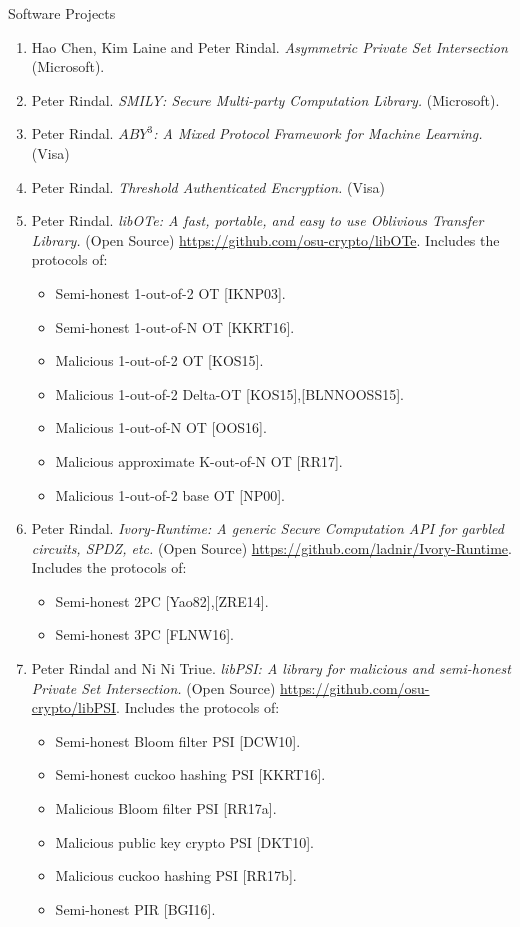 \documentclass{resume} %
\begin{document}
\begin{rSection}{Software Projects}
	
	
	\begin{enumerate}[label=S\arabic* --]
		
		\item Hao Chen, Kim Laine and Peter Rindal. \emph{Asymmetric Private Set Intersection} (Microsoft).
		
		\item Peter Rindal. \emph{SMILY: Secure Multi-party Computation Library.} (Microsoft).
		
		\item  Peter Rindal. \emph{$ABY^3$: A Mixed Protocol Framework for Machine Learning.}  (Visa)
		
		
		\item Peter Rindal. \emph{Threshold Authenticated Encryption.} (Visa)
		
		\item Peter Rindal. \emph{libOTe: A fast, portable, and easy to use Oblivious Transfer Library.}  (Open Source) \url{https://github.com/osu-crypto/libOTe}. Includes the protocols of:
		\begin{itemize}
			\item Semi-honest 1-out-of-2 OT [IKNP03]. 
			\item Semi-honest 1-out-of-N OT [KKRT16].
			\item Malicious 1-out-of-2 OT [KOS15].
			\item Malicious 1-out-of-2 Delta-OT [KOS15],[BLNNOOSS15].
			\item Malicious 1-out-of-N OT [OOS16].
			\item Malicious approximate K-out-of-N OT [RR17].
			\item Malicious 1-out-of-2 base OT [NP00].
		\end{itemize}
		\item Peter Rindal. \emph{Ivory-Runtime: A generic Secure Computation API for garbled circuits, SPDZ, etc.} (Open Source)  \url{https://github.com/ladnir/Ivory-Runtime}. Includes the protocols of:
		\begin{itemize}
			\item Semi-honest 2PC [Yao82],[ZRE14].
			\item Semi-honest 3PC [FLNW16].
		\end{itemize}
		
		\item Peter Rindal and Ni Ni Triue. \emph{libPSI: A library for malicious and semi-honest Private Set Intersection.} (Open Source) \url{https://github.com/osu-crypto/libPSI}. Includes the protocols of:
		\begin{itemize}		
		\item Semi-honest Bloom filter PSI [DCW10]. 
		\item Semi-honest cuckoo hashing PSI [KKRT16]. 
		\item Malicious Bloom filter PSI [RR17a]. 
		\item Malicious public key crypto PSI [DKT10]. 
		\item Malicious cuckoo hashing PSI [RR17b]. 
		\item Semi-honest PIR [BGI16].		
	\end{itemize}


\end{enumerate}
\end{rSection}
\end{document}
